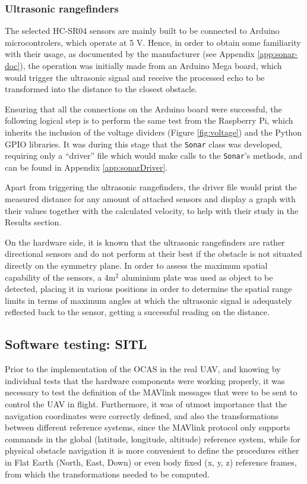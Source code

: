 \subsubsection{Ultrasonic rangefinders} \label{sec:sonartest}

The selected HC-SR04 sensors are mainly built to be connected to Arduino microcontrolers, which operate at 5 V.
Hence, in order to obtain some familiarity with their usage, as documented by the manufacturer (see Appendix \ref{app:sonar-doc}), the operation was initially made from an Arduino Mega board, which would trigger the ultrasonic signal and receive the processed echo to be transformed into the distance to the closest obstacle.

Ensuring that all the connections on the Arduino board were successful, the following logical step is to perform the same test from the Raspberry Pi, which inherits the inclusion of the voltage dividers (Figure \ref{fig:voltage}) and the Python GPIO libraries.
It was during this stage that the \texttt{Sonar} class was developed, requiring only a ``driver'' file which would make calls to the \texttt{Sonar}'s methods, and can be found in Appendix \ref{app:sonarDriver}.

Apart from triggering the ultrasonic rangefinders, the driver file would print the measured distance for any amount of attached sensors and display a graph with their values together with the calculated velocity, to help with their study in the Results section.

On the hardware side, it is known that the ultrasonic rangefinders are rather directional sensors and do not perform at their best if the obstacle is not situated directly on the symmetry plane.
In order to assess the maximum spatial capability of the sensors, a 4m$^2$ aluminium plate was used as object to be detected, placing it in various positions in order to determine the spatial range limits in terms of maximum angles at which the ultrasonic signal is adequately reflected back to the sensor, getting a successful reading on the distance.


\subsection{Software testing: SITL}

Prior to the implementation of the OCAS in the real UAV, and knowing by individual tests that the hardware components were working properly, it was necessary to test the definition of the MAVlink messages that were to be sent to control the UAV in flight.
Furthermore, it was of utmost importance that the navigation coordinates were correctly defined, and also the transformations between different reference systems, since the MAVlink protocol only supports commands in the global (latitude, longitude, altitude) reference system, while for physical obstacle navigation it is more convenient to define the procedures either in Flat Earth (North, East, Down) or even body fixed (x, y, z) reference frames, from which the transformations needed to be computed.

